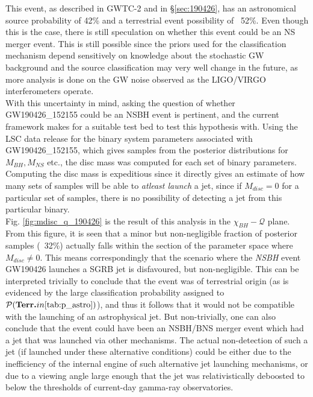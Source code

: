         This event, as described in GWTC-2 and in \S\ref{sec:190426}, has an
        astronomical source probability of 42\% and a terrestrial event possibility of
        ~52\%. Even though this is the case, there is still speculation on whether this
        event could be an NS merger event.  This is still possible since the priors used
        for the classification mechanism depend sensitively on knowledge about the
        stochastic GW background and the source classification may very well change in
        the future, as more analysis is done on the GW noise observed as the LIGO/VIRGO
        interferometers operate.\\
        With this uncertainty in mind, asking the question of whether GW190426\_152155
        could be an NSBH event is pertinent, and the current framework makes for a
        suitable test bed to test this hypothesis with. Using the LSC data release for
        the binary system parameters associated with GW190426\_152155, which gives
        samples from the posterior distributions for $M_{BH}, M_{NS}$ etc., the disc
        mass was computed for each set of binary parameters. Computing the disc mass is
        expeditious since it directly gives an estimate of how many sets of samples will
        be able to \textit{atleast launch} a jet, since if $M_{disc} = 0$ for a
        particular set of samples, there is no possibility of detecting a jet from this
        particular binary.\\
        Fig. \ref{fig:mdisc_q_190426} is the result of this analysis in the
        $\chi_{BH}-\mathcal{Q}$ plane. From this figure, it is seen that a minor but
        non-negligible fraction of posterior samples (~32\%) actually falls within the
        section of the parameter space where $M_{disc} \neq 0$. This means
        correspondingly that the scenario where the \emph{NSBH} event GW190426 launches
        a SGRB jet is disfavoured, but non-negligible. This can be interpreted trivially
        to conclude that the event was of terrestrial origin (as is evidenced by the
        large classification probability assigned to $\mathcal{P}(\textbf{Terr.} in
        \ref{tab:p_astro})$), and thus it follows that it would not be compatible with
        the launching of an astrophysical jet. But non-trivially, one can also conclude
        that the event could have been an NSBH/BNS merger event which had a jet that was
        launched via other mechanisms. The actual non-detection of such a jet (if
        launched under these alternative conditions) could be either due to the
        inefficiency of the internal engine of such alternative jet launching
        mechanisms, or due to a viewing angle large enough that the jet was
        relativistically deboosted to below the thresholds of current-day gamma-ray
        observatories.

